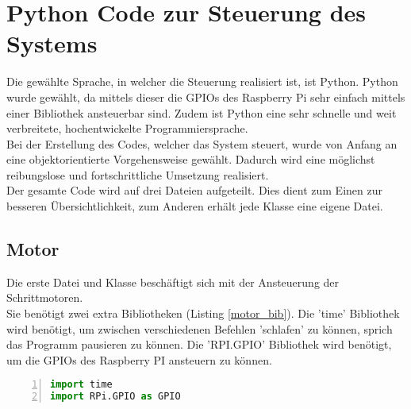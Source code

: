 
\chapter{Python Code zur Steuerung des Systems}\label{chap:code}
Die gewählte Sprache, in welcher die Steuerung realisiert ist, ist Python. Python wurde gewählt, da mittels dieser die \acp{GPIO} des Raspberry Pi sehr einfach mittels einer Bibliothek ansteuerbar sind. Zudem ist Python eine sehr schnelle und weit verbreitete, hochentwickelte Programmiersprache.\\
Bei der Erstellung des Codes, welcher das System steuert, wurde von Anfang an eine objektorientierte Vorgehensweise gewählt. Dadurch wird eine möglichst reibungslose und fortschrittliche Umsetzung realisiert.\\
Der gesamte Code wird auf drei Dateien aufgeteilt. Dies dient zum Einen zur besseren Übersichtlichkeit, zum Anderen erhält jede Klasse eine eigene Datei.
\section{Motor}
Die erste Datei und Klasse beschäftigt sich mit der Ansteuerung der Schrittmotoren.\\
Sie benötigt zwei extra Bibliotheken (Listing \ref{motor_bib}). Die 'time' Bibliothek wird benötigt, um zwischen verschiedenen Befehlen 'schlafen' zu können, sprich das Programm pausieren zu können. Die 'RPI.GPIO' Bibliothek wird benötigt, um die \acp{GPIO} des Raspberry PI ansteuern zu können. 
\begin{lstlisting}[caption={Bibliotheken der Motor Klasse}, language={Python}, label={motor_bib}, numbers=left]
import time
import RPi.GPIO as GPIO	
\end{lstlisting}

